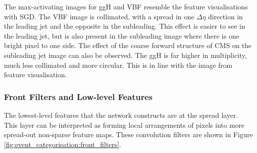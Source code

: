 The max-activating images for ggH and VBF resemble the feature visualisations with SGD. 
The VBF image is collimated, with a spread in one $\Delta\eta$ direction in the leading jet and the opposite in the subleading. 
This effect is easier to see in the leading jet, but is also present in the subleading image where there is one bright pixel to one side.
The effect of the coarse forward structure of CMS on the subleading jet image can also be observed. 
The ggH is far higher in multiplicity, much less collimated and more circular. This is in line with the image from feature visualisation. 


\subsubsection{Front Filters and Low-level Features}
The lowest-level features that the network constructs are at the spread layer. 
This layer can be interpreted as forming local arrangements of pixels into more spread-out non-sparse feature maps. 
These convolution filters are shown in Figure \ref{fig:event_categorisation:front_filters}.

